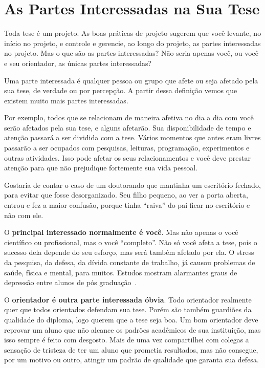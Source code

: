 \chapter{As Partes Interessadas na Sua Tese}

Toda tese é um projeto. As boas práticas de projeto sugerem que você levante, no início no projeto, e controle e gerencie, ao longo do projeto, as partes interessadas no projeto.
Mas o que são as partes interessadas? Não seria apenas você, ou você e seu orientador, as únicas partes interessadas?

Uma parte interessada é qualquer pessoa ou grupo que afete ou seja afetado pela sua tese, de verdade ou por percepção. A partir dessa definição vemos que existem muito mais partes interessadas.

Por exemplo, todos que se relacionam de maneira afetiva no dia a dia com você serão afetados pela sua tese, e alguns afetarão. 
Sua disponibilidade de tempo e atenção passará a ser dividida com a tese. 
Vários momentos que antes eram livres passarão a ser ocupados com pesquisas, leituras, programação, experimentos e outras atividades. 
Isso pode afetar os seus relacionamentos e você deve prestar atenção para que não prejudique fortemente sua vida pessoal.

Gostaria de contar o caso de um doutorando que mantinha um escritório fechado, para evitar que fosse desorganizado. 
Seu filho pequeno, ao ver a porta aberta, entrou e fez a maior confusão, porque tinha “raiva” do pai ficar no escritório e não com ele.

O \textbf{principal interessado normalmente é você}. Mas não apenas o você científico ou profissional, mas o você “completo”. Não só você afeta a tese, pois o sucesso dela depende do seu esforço, mas será também afetado por ela. O stress da pesquisa, da defesa, da dívida constante de trabalho, já causou problemas de saúde, física e mental, para muitos. Estudos mostram alarmantes  graus de depressão entre alunos de pós graduação~\citep{walker2015}.

O \textbf{orientador é outra parte interessada óbvia}. Todo orientador realmente quer que todos orientados defendam sua tese. Porém são também guardiões da qualidade do diploma, logo querem que a tese seja boa. Um bom orientador deve reprovar um aluno que não alcance os padrões acadêmicos de sua instituição, mas isso sempre é feito com desgosto. Mais de uma vez compartilhei com colegas a sensação de tristeza de ter um aluno que prometia resultados, mas não consegue, por um motivo ou outro, atingir um padrão de qualidade que garanta sua defesa.

